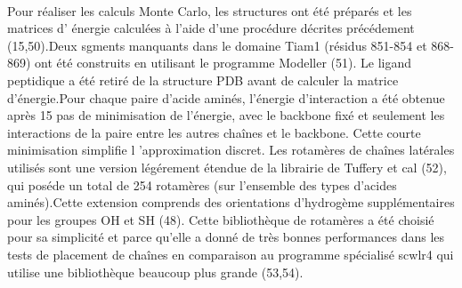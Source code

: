 \begin{enumarete}
\paragraph{}

Pour réaliser les calculs Monte Carlo, les structures ont été préparés et les matrices d' énergie calculées à l'aide d'une procédure décrites précédement (15,50).Deux sgments manquants dans le domaine Tiam1 (résidus 851-854 et 868-869) ont été construits en utilisant le programme Modeller (51). Le ligand peptidique a été retiré de la structure PDB avant de calculer la matrice d'énergie.Pour chaque paire d'acide aminés, l'énergie d'interaction a été obtenue après 15 pas de minimisation de l'énergie, avec le backbone fixé et seulement les interactions de la paire entre les autres chaînes et le backbone. Cette courte minimisation simplifie l 'approximation discret. Les rotamères de chaînes latérales utilisés sont une version légérement étendue de la librairie de Tuffery et cal (52), qui poséde un total de 254 rotamères (sur l'ensemble des types d'acides aminés).Cette extension comprends des orientations d'hydrogème supplémentaires pour les groupes OH et SH (48). Cette bibliothèque de rotamères a été choisié pour sa simplicité et parce qu'elle a donné de très bonnes performances dans les tests de placement de chaînes en comparaison au programme spécialisé scwlr4 qui utilise une bibliothèque beaucoup plus grande (53,54).


    
    \begin{table}[!htbp]
      \centering

      \begin{tabular}{ccccccccc}


\end{tabular}
\end{table}
\end{enumarete}
